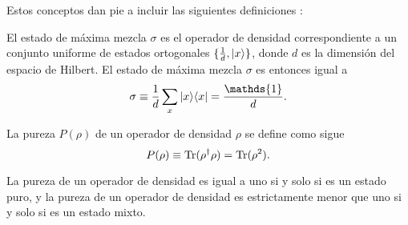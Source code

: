 Estos conceptos dan pie a incluir las siguientes definiciones {\cite{wilde2011classical}}: 
\begin{definition} El estado de máxima mezcla
$\sigma$ es el operador de densidad correspondiente a un conjunto uniforme de
estados ortogonales $\{\frac{1}{d},|x\rangle\}$, donde $d$ es la dimensión del
espacio de Hilbert. El estado de máxima mezcla $\sigma$ es entonces igual a
\begin{equation}\label{maximallyMixedState}
		\sigma \equiv \dfrac{1}{d}\sum_x|x\rala x|=\dfrac{\mathds{1}}{d}.
	\end{equation}
\end{definition}


\begin{definition} La pureza $P(\rho)$ de un operador de densidad $\rho$ se define como sigue {\cite{wilde2011classical}} \begin{equation}
	P(\rho)\equiv{\rm Tr}(\rho^\dagger\rho)={\rm Tr}(\rho^2).
\end{equation}

	\end{definition}


\begin{proposition}
	La pureza de un operador de densidad es igual a uno si y solo si es un estado puro, y la pureza de un operador de densidad es estrictamente menor que uno si y solo si es un estado mixto.
	\end{proposition}


